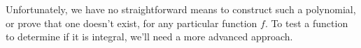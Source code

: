 Unfortunately, we have no straightforward means to construct such a
polynomial, or prove that one doesn't exist, for any particular
function $f$.  To test a function to determine if it is integral,
we'll need a more advanced approach.

%
%
%
%
%
%
%
%
%
%
%
%
%
%
%
%
%
%
%
%
